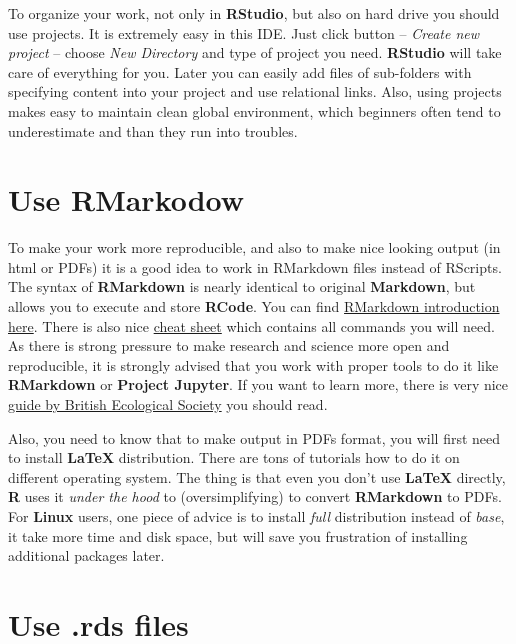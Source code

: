 \documentclass[]{book}
\theoremstyle{definition}
\theoremstyle{definition}
\theoremstyle{definition}
\theoremstyle{remark}
\begin{document}
To organize your work, not only in \textbf{RStudio}, but also on hard
drive you should use projects. It is extremely easy in this IDE. Just
click button -- \emph{Create new project} -- choose \emph{New Directory}
and type of project you need. \textbf{RStudio} will take care of
everything for you. Later you can easily add files of sub-folders with
specifying content into your project and use relational links. Also,
using projects makes easy to maintain clean global environment, which
beginners often tend to underestimate and than they run into troubles.

\section{Use RMarkodow}\label{use-rmarkodow}

To make your work more reproducible, and also to make nice looking
output (in html or PDFs) it is a good idea to work in RMarkdown files
instead of RScripts. The syntax of \textbf{RMarkdown} is nearly
identical to original \textbf{Markdown}, but allows you to execute and
store \textbf{RCode}. You can find
\href{http://rmarkdown.rstudio.com/articles_intro.html}{RMarkdown
introduction here}. There is also nice
\href{https://www.rstudio.com/wp-content/uploads/2015/02/rmarkdown-cheatsheet.pdf}{cheat
sheet} which contains all commands you will need. As there is strong
pressure to make research and science more open and reproducible, it is
strongly advised that you work with proper tools to do it like
\textbf{RMarkdown} or \textbf{Project Jupyter}. If you want to learn
more, there is very nice
\href{https://www.britishecologicalsociety.org/wp-content/uploads/2017/12/guide-to-reproducible-code.pdf}{guide
by British Ecological Society} you should read.

Also, you need to know that to make output in PDFs format, you will
first need to install \textbf{LaTeX} distribution. There are tons of
tutorials how to do it on different operating system. The thing is that
even you don't use \textbf{LaTeX} directly, \textbf{R} uses it
\emph{under the hood} to (oversimplifying) to convert \textbf{RMarkdown}
to PDFs. For \textbf{Linux} users, one piece of advice is to install
\emph{full} distribution instead of \emph{base}, it take more time and
disk space, but will save you frustration of installing additional
packages later.

\section{Use .rds files}\label{use-.rds-files}
\end{document}

